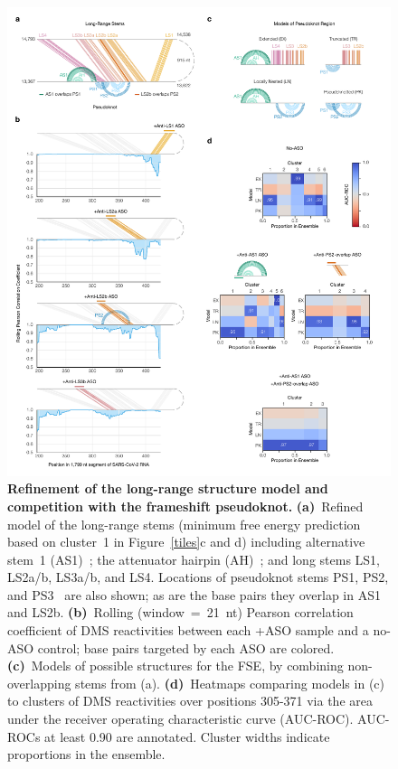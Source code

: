 \documentclass[main.tex]{subfiles}
\begin{document}
\begin{figure}[H]
	\includegraphics[width=\textwidth]{../MainFigures/lnas/lnas.pdf}
	\caption{\textbf{Refinement of the long-range structure model and competition with the frameshift pseudoknot.} \textbf{(a)}~Refined model of the long-range stems (minimum free energy prediction based on cluster~1 in Figure~\ref{tiles}c and d) including alternative stem~1 (AS1)~\cite{Lan2022}; the attenuator hairpin (AH)~\cite{Su2005}; and long stems LS1, LS2a/b, LS3a/b, and LS4. Locations of pseudoknot stems PS1, PS2, and PS3~\cite{KZhang2021} are also shown; as are the base pairs they overlap in AS1 and LS2b. \textbf{(b)}~Rolling (window~=~21~nt) Pearson correlation coefficient of DMS reactivities between each +ASO sample and a no-ASO control; base pairs targeted by each ASO are colored. \textbf{(c)}~Models of possible structures for the FSE, by combining non-overlapping stems from (a). \textbf{(d)}~Heatmaps comparing models in (c) to clusters of DMS reactivities over positions 305-371 via the area under the receiver operating characteristic curve (AUC-ROC). AUC-ROCs at least 0.90 are annotated. Cluster widths indicate proportions in the ensemble.}
	\label{lnas}
\end{figure}
\end{document}
